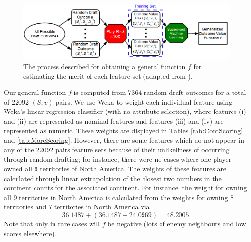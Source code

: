 \documentclass[letterpaper]{article}
\numberwithin{equation}{section}
\numberwithin{theorem}{section}
\numberwithin{lemma}{section}
\numberwithin{df}{section}
\begin{document}
\begin{figure}[t]
	\centering
	\includegraphics[scale=0.5]{figs/MachineLearner.png}
	\caption{The process described for obtaining a general function $f$ for estimating the merit of each feature set (adapted from \cite[Figure 5.1]{GregLeeThesis}).}
	\label{fig:MachLearn}
\end{figure}

Our general function $f$ is computed from 7364 random draft outcomes for a total of 22092 $(S,v)$ pairs.  We use Weka \cite{Weka} to weight each individual feature using Weka's linear regression classifier (with no attribute selection), where features (i) and (ii) are represented as nominal features and features (iii) and (iv) are represented as numeric.  These weights are displayed in Tables \ref{tab:ContScoring} and \ref{tab:MoreScoring}.  However, there are some features which do not appear in any of the 22092 pairs feature sets because of their unlikeliness of occurring through random drafting; for instance, there were no cases where one player owned all 9 territories of North America.  The weights of these features are calculated through linear extrapolation of the closest two numbers in the continent counts for the associated continent.  For instance, the weight for owning all 9 territories in North America is calculated from the weights for owning 8 territories and 7 territories in North America via
\[ 36.1487 + (36.1487 - 24.0969) = 48.2005. \]  
Note that only in rare cases will $f$ be negative (lots of enemy neighbours and low scores elsewhere).  %
\end{document}
